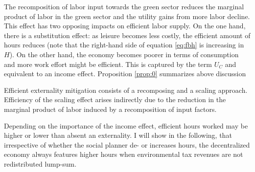 The recomposition of labor input towards the  green sector reduces the marginal product of labor in the green sector and the utility gains from more labor decline.  This effect has two opposing impacts on efficient labor supply. On the one hand, there is a substitution effect: as leisure becomes less costly, the efficient amount of hours reduces (note that the right-hand side of equation \ref{eq:fbh} is increasing in $H$). On the other hand, the economy becomes poorer in terms of consumption and more work effort might be efficient. This is captured by the term $U_C$ and equivalent to an income effect. 
Proposition \ref{prop:0} summarizes above discussion
\begin{prop}\label{prop:0}
	Efficient externality mitigation consists of a recomposing and a scaling approach. Efficiency of the scaling effect arises indirectly due to the reduction in the marginal product of labor induced by a recomposition of input factors.
\end{prop}


Depending on the importance of the income effect, efficient hours worked may be higher or lower than  absent an externality. %
I will show in the following, that irrespective of whether the social planner de- or increases hours, the decentralized economy always features higher hours when environmental tax revenues are not redistributed lump-sum. 

\begin{comment}
\hrule
One can show that the total effect of a drop in the fossil labor share on hours worked is positive, i.e. $\frac{dh_{FB}}{ds}>0$, if $\theta<\frac{\varepsilon}{\varepsilon-s}$. If the income effect dominates, the social planner increases hours worked as the economy becomes less productive. 
Under the value for $\theta$ suggested by \cite{Boppart2019LaborPerspectiveb}, the efficient scale effect is to increase hours worked. When, however, the substitution effect outweighs or dominates the income effect - as commonly assumed in the public finance literature \citep{Heathcote2017OptimalFramework, LansBovenberg1994EnvironmentalTaxation, LansBovenberg1996OptimalAnalyses} \tr{CHECK this}!.
Nevertheless, the level of hours worked exceeds the efficient level irrespective of $\theta$ when no lump-sum transfers are available. 
When the efficient level of hours increases, though, the fossil labor share reduces even more to outweigh the increase in the externality.

content...
\end{comment}
